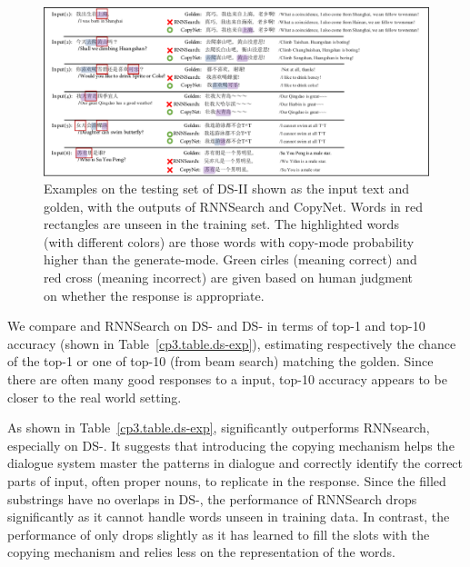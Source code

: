\begin{figure}[htbp]
   	\centering
          	\includegraphics[width=.99\linewidth]{figs/copynet/ds-exp-rX.pdf} 
          	\caption{\label{cp3.fig.ds-exp} Examples on the testing set of DS-II shown as the input text and golden, with the outputs of RNNSearch and CopyNet. Words in red rectangles are unseen in the training set. The highlighted words (with different colors) are those words with copy-mode probability higher than the generate-mode. Green cirles (meaning correct) and red cross (meaning incorrect) are given based on human judgment on whether the response is appropriate. } 
  \end{figure}   


We compare \copynet and RNNSearch on DS-\uppercase\expandafter{} and  DS-\uppercase\expandafter{} in terms of top-1 and top-10 accuracy (shown in Table~\ref{cp3.table.ds-exp}), estimating respectively the chance of the top-1 or one of top-10 (from beam search) matching the golden. Since there are often many good responses to a input, top-10 accuracy appears to be closer to the real world setting. 

As shown in Table~\ref{cp3.table.ds-exp}, \copynet significantly  outperforms RNNsearch, especially on DS-\uppercase\expandafter{}. It suggests that introducing the copying mechanism helps the dialogue system master the patterns in dialogue and correctly identify the correct parts of input, often proper nouns, to replicate in the response. Since the filled substrings have no overlaps in DS-\uppercase\expandafter{}, the performance of RNNSearch drops significantly as it cannot handle words unseen in training data. In contrast, the performance of \copynet only drops slightly as it has learned to fill the slots with the copying mechanism and relies less on the representation of the words.

